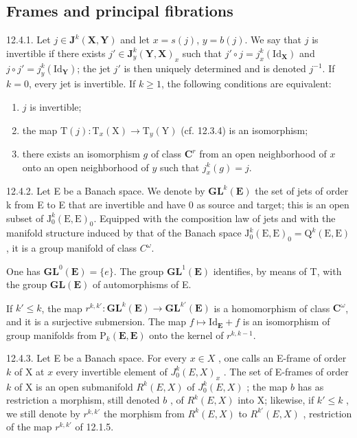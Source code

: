 \subsection{Frames and principal fibrations}

12.4.1. Let \(j \in \mathbf{J}^k(\mathbf{X}, \mathbf{Y})\) and let \(x = s(j)\), \(y = b(j)\). We say that \(j\) is invertible if there exists \(j' \in \mathbf{J}_y^k(\mathbf{Y}, \mathbf{X})_x\) such that \(j' \circ j = j_x^k(\mathrm{Id}_{\mathbf{X}})\) and \(j \circ j' = j_y^k(\mathrm{Id}_{\mathbf{Y}})\); the jet \(j'\) is then uniquely determined and is denoted \(j^{-1}\). If \(k = 0\), every jet is invertible. If \(k \geqslant 1\), the following conditions are equivalent:

\begin{enumerate}
\def\labelenumi{\alph{enumi})}
\item
  \(j\) is invertible;
\item
  the map \(\mathrm{T}(j)\colon\mathrm{T}_{x}(\mathrm{X})\rightarrow\mathrm{T}_{y}(\mathrm{Y})\) (cf. 12.3.4) is an isomorphism;
\item
  there exists an isomorphism \(g\) of class \(\mathbf{C}^r\) from an open neighborhood of \(x\) onto an open neighborhood of \(y\) such that \(j_x^k(g) = j\).
\end{enumerate}

12.4.2. Let E be a Banach space. We denote by \(\mathbf{GL}^{k}(\mathbf{E})\) the set of jets of order k from E to E that are invertible and have 0 as source and target; this is an open subset of \(\mathrm{J}_{0}^{k}(\mathrm{E},\mathrm{E})_{0}\). Equipped with the composition law of jets and with the manifold structure induced by that of the Banach space \(\mathrm{J}_{0}^{k}(\mathrm{E},\mathrm{E})_{0}=\mathrm{Q}^{k}(\mathrm{E},\mathrm{E})\), it is a group manifold of class \(C^{\omega}\).

One has \(\mathbf{GL}^0 (\mathbf{E}) = \{e\}\). The group \(\mathbf{GL}^1 (\mathbf{E})\) identifies, by means of T, with the group \(\mathbf{GL}(\mathbf{E})\) of automorphisms of E.

If \(k' \leqslant k\), the map \(r^{k, k'}: \mathbf{GL}^k(\mathbf{E}) \to \mathbf{GL}^{k'}(\mathbf{E})\) is a homomorphism of class \(\mathbf{C}^\omega\), and it is a surjective submersion. The map \(f \mapsto \mathrm{Id}_{\mathbf{E}} + f\) is an isomorphism of group manifolds from \(\mathrm{P}_k(\mathbf{E}, \mathbf{E})\) onto the kernel of \(r^{k, k-1}\).

12.4.3. Let E be a Banach space. For every \(x \in X\) , one calls an E-frame of order \(k\) of X at \(x\) every invertible element of \(J_0^k(E, X)_x\) . The set of E-frames of order \(k\) of X is an open submanifold \(R^k(E, X)\) of \(J_0^k(E, X)\) ; the map \(b\) has as restriction a morphism, still denoted \(b\) , of \(R^k(E, X)\) into X; likewise, if \(k' \leqslant k\) , we still denote by \(r^{k, k'}\) the morphism from \(R^k(E, X)\) to \(R^{k'}(E, X)\) , restriction of the map \(r^{k, k'}\) of 12.1.5.

